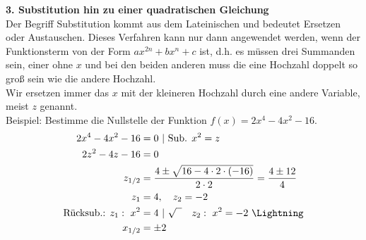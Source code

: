 \textbf{3. Substitution hin zu einer quadratischen Gleichung}\\
Der Begriff Substitution kommt aus dem Lateinischen und bedeutet Ersetzen oder Austauschen. Dieses Verfahren kann nur dann angewendet werden, wenn der Funktionsterm von der Form \(ax^{2n}+bx^n+c\) ist, d.h. es müssen drei Summanden sein, einer ohne \(x\) und bei den beiden anderen muss die eine Hochzahl doppelt so groß sein wie die andere Hochzahl.\\
Wir ersetzen immer das \(x\) mit der kleineren Hochzahl durch eine andere Variable, meist \(z\) genannt.\\
Beispiel: Bestimme die Nullstelle der Funktion \(f(x)=2x^4-4x^2-16\).
\textcolor{loes}{\begin{align*}\large
		2x^4-4x^2-16&=0\ \vert\ \text{Sub. }x^2=z\\
		2z^2-4z-16&=0\\
		z_{1/2}&=\frac{4\pm\sqrt{16-4\cdot 2\cdot \left( -16\right) }}{2\cdot 2}=\frac{4\pm 12}{4}\\
		z_1&=4,\quad z_2=-2\\
		\text{Rücksub.: }z_1:\ x^2&=4\ \vert\ \sqrt{\phantom{x}}\quad z_2:\ x^2=-2\ \Lightning\\
		x_{1/2}&=\pm2
\end{align*}}
\newpage

